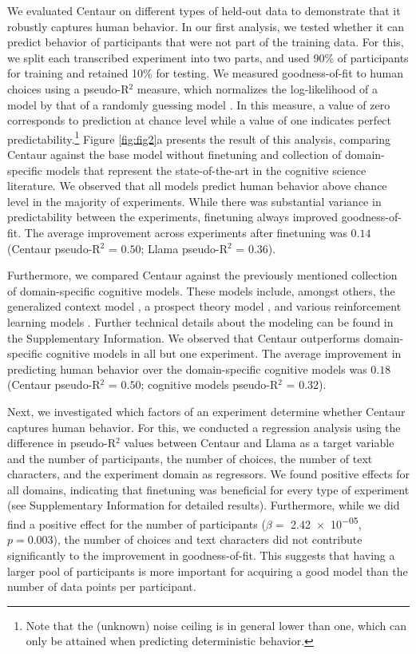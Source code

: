 \documentclass[pdflatex,sn-nature]{sn-jnl}%
\theoremstyle{thmstyleone}%
\theoremstyle{thmstyletwo}%
\theoremstyle{thmstylethree}%
\begin{document}
We evaluated Centaur on different types of held-out data to demonstrate that it robustly captures human behavior. In our first analysis, we tested whether it can predict behavior of participants that were not part of the training data. For this, we split each transcribed experiment into two parts, and used 90\% of participants for training and retained 10\% for testing. We measured goodness-of-fit to human choices using a pseudo-R$^2$ measure, which normalizes the log-likelihood of a model by that of a randomly guessing model \cite{wu2018generalization}. In this measure, a value of zero corresponds to prediction at chance level while a value of one indicates perfect predictability.\footnote{Note that the (unknown) noise ceiling is in general lower than one, which can only be attained when predicting deterministic behavior.} Figure \ref{fig:fig2}a presents the result of this analysis, comparing Centaur against the base model without finetuning and collection of domain-specific models that represent the state-of-the-art in the cognitive science literature. We observed that all models predict human behavior above chance level in the majority of experiments. While there was substantial variance in predictability between the experiments, finetuning always improved goodness-of-fit. The average improvement across experiments after finetuning was $0.14$ (Centaur pseudo-R$^2$ = $0.50$; Llama pseudo-R$^2$ = $0.36$).

Furthermore, we compared Centaur against the previously mentioned collection of domain-specific cognitive models. These models include, amongst others, the generalized context model \cite{nosofsky2011generalized}, a prospect theory model \cite{peterson2021using}, and various reinforcement learning models \cite{daw2011model, wilson2014humans}. Further technical details about the modeling can be found in the Supplementary Information. We observed that Centaur outperforms domain-specific cognitive models in all but one experiment. The average improvement in predicting human behavior over the domain-specific cognitive models was $0.18$ (Centaur pseudo-R$^2$ = $0.50$; cognitive models pseudo-R$^2$ = $0.32$).

Next, we investigated which factors of an experiment determine whether Centaur captures human behavior. For this, we conducted a regression analysis using the difference in pseudo-R$^2$ values between Centaur and Llama as a target variable and the number of participants, the number of choices, the number of text characters, and the experiment domain as regressors. We found positive effects for all domains, indicating that finetuning was beneficial for every type of experiment (see Supplementary Information for detailed results). Furthermore, while we did find a positive effect for the number of participants ($\beta =$ \num{2.42e-05}, $p = 0.003$), the number of choices and text characters did not contribute significantly to the improvement in goodness-of-fit. This suggests that having a larger pool of participants is more important for acquiring a good model than the number of data points per participant.
\end{document}
